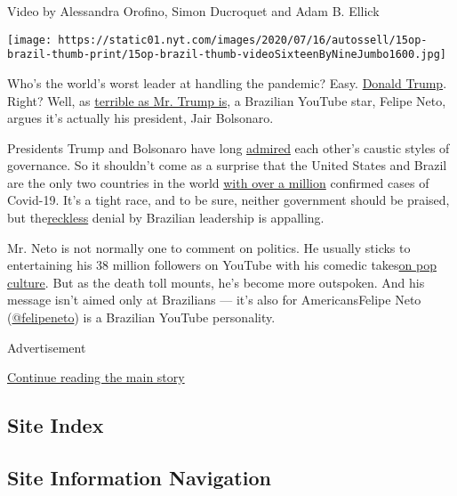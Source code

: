 Video by Alessandra Orofino, Simon Ducroquet and Adam B. Ellick

\texttt{[image: https://static01.nyt.com/images/2020/07/16/autossell/15op-brazil-thumb-print/15op-brazil-thumb-videoSixteenByNineJumbo1600.jpg]}

Who's the world's worst leader at handling the pandemic? Easy.
\href{https://www.nytimes.com/2020/07/28/technology/virus-video-trump.html}{Donald
Trump}. Right? Well, as
\href{https://www.cnn.com/2020/07/10/politics/abc-ipsos-poll-trump-coronavirus/index.html}{terrible
as Mr. Trump is}, a Brazilian YouTube star, Felipe Neto, argues it's
actually his president, Jair Bolsonaro.

Presidents Trump and Bolsonaro have long
\href{https://www.nbcnews.com/news/latino/trump-praises-brazil-s-far-right-president-white-house-n985116}{admired}
each other's caustic styles of governance. So it shouldn't come as a
surprise that the United States and Brazil are the only two countries in
the world
\href{https://www.nytimes.com/2020/06/19/world/coronavirus-live-updates.html}{with
over a million} confirmed cases of Covid-19. It's a tight race, and to
be sure, neither government should be praised, but
the\href{https://www.cnn.com/2020/06/19/americas/brazil-one-million-coronavirus-jair-bolsonaro-cases-intl/index.html}{reckless}
denial by Brazilian leadership is appalling.

Mr. Neto is not normally one to comment on politics. He usually sticks
to entertaining his 38 million followers on YouTube with his comedic
takes\href{https://www.youtube.com/watch?v=tgxw_0r0s20}{on pop culture}.
But as the death toll mounts, he's become more outspoken. And his
message isn't aimed only at Brazilians --- it's also for AmericansFelipe
Neto (\href{https://twitter.com/felipeneto}{@felipeneto}) is a Brazilian
YouTube personality.

Advertisement

\protect\hyperlink{after-bottom}{Continue reading the main story}

\hypertarget{site-index}{%
\subsection{Site Index}\label{site-index}}

\hypertarget{site-information-navigation}{%
\subsection{Site Information
Navigation}\label{site-information-navigation}}

